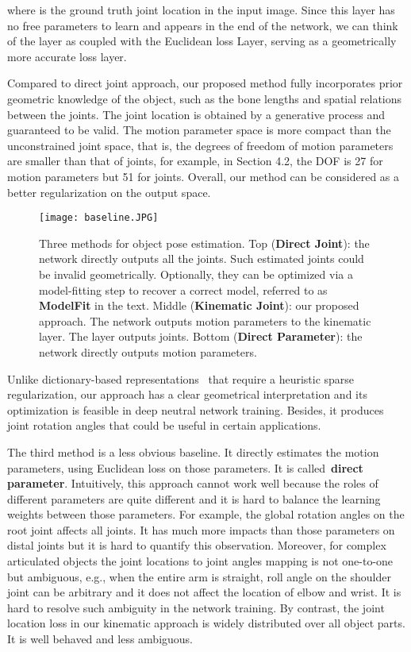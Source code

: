 \documentclass[runningheads]{llncs}
\begin{document}
where  is the ground truth joint location in the input image. Since this layer has no free parameters to learn and appears in the end of the network, we can think of the layer as coupled with the Euclidean loss Layer, serving as a geometrically more accurate loss layer.

Compared to direct joint approach, our proposed method fully incorporates prior geometric knowledge of the object, such as the bone lengths and spatial relations between the joints. The joint location is obtained by a generative process and guaranteed to be valid. The motion parameter space is more compact than the unconstrained joint space, that is, the degrees of freedom of motion parameters are smaller than that of joints, for example, in Section 4.2, the DOF is 27 for motion parameters but 51 for joints. Overall, our method can be considered as a better regularization on the output space.

\begin{figure}
\begin{center}
\texttt{[image: baseline.JPG]}
\end{center}
   \caption{Three methods for object pose estimation. Top (\textbf{Direct Joint}): the network directly outputs all the joints. Such estimated joints could be invalid geometrically. Optionally, they can be optimized via a model-fitting step to recover a correct model, referred to as \textbf{ModelFit} in the text. Middle (\textbf{Kinematic Joint}): our proposed approach. The network outputs motion parameters to the kinematic layer. The layer outputs joints. Bottom (\textbf{Direct Parameter}): the network directly outputs motion parameters.}
\label{fig:methods}
\end{figure}


Unlike dictionary-based representations~\cite{Wang_2014_CVPR,Zhou_2015_CVPR} that require a heuristic sparse regularization, our approach has a clear geometrical interpretation and its optimization is feasible in deep neutral network training. Besides, it produces joint rotation angles that could be useful in certain applications.


The third method is a less obvious baseline. It directly estimates the motion parameters, using Euclidean loss on those parameters. It is called~\textbf{direct parameter}. Intuitively, this approach cannot work well because the roles of different parameters are quite different and it is hard to balance the learning weights between those parameters. For example, the global rotation angles on the root joint affects all joints. It has much more impacts than those parameters on distal joints but it is hard to quantify this observation. Moreover, for complex articulated objects the joint locations to joint angles mapping is not one-to-one but ambiguous, e.g., when the entire arm is straight, roll angle on the shoulder joint can be arbitrary and it does not affect the location of elbow and wrist. It is hard to resolve such ambiguity in the network training. By contrast, the joint location loss in our kinematic approach is widely distributed over all object parts. It is well behaved and less ambiguous.
\end{document}
